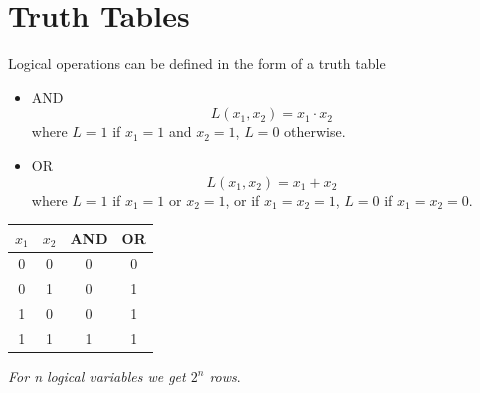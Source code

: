 \documentclass[12pt,openany, tikz,border=10pt]{book}
\begin{document}
			      	\section{Truth Tables}
			      	Logical operations can be defined in the form of a truth table
			      	\begin{itemize}
			      		\item[] AND
			      		      \begin{equation*}
			      		      	L(x_1, x_2) = x_1 \cdot x_2
			      		      \end{equation*}
			      		      where \( L = 1 \) if \( x_1 = 1 \) and \( x_2 = 1 \), \( L = 0 \) otherwise.
			      		            
			      		\item[] OR
			      		      \begin{equation*}
			      		      	L(x_1, x_2) = x_1 + x_2
			      		      \end{equation*}
			      		      where \( L = 1 \) if \( x_1 = 1 \) or \( x_2 = 1 \), or if \( x_1 = x_2 = 1 \), \( L = 0 \) if \( x_1 = x_2 = 0 \).
			      	\end{itemize}
			      	  
			      	\begin{center}
			      		\begin{tabular}{ c c | c | c }
			      			\( x_1 \) & \( x_2 \) & AND & OR \\
			      			\hline
			      			0         & 0         & 0   & 0  \\
			      			0         & 1         & 0   & 1  \\
			      			1         & 0         & 0   & 1  \\
			      			1         & 1         & 1   & 1  \\
			      			      
			      		\end{tabular}
			      	\end{center}
			      	
			      	
			      	\textit{For n logical variables we get $2^n$ rows}.\newline
			      	\vspace*{-10px}
\end{document}
